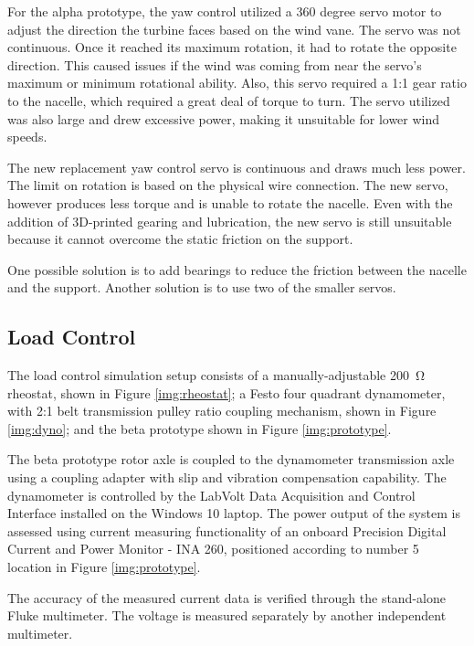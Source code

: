 \documentclass[11pt,letterpaper,conference]{IEEEtran}
\begin{document}
For the alpha prototype, the yaw control utilized a 360 degree servo motor to
adjust the direction the turbine faces based on the wind vane. The servo was
not continuous. Once it reached its maximum rotation, it had to rotate the
opposite direction. This caused issues if the wind was coming from near the
servo's maximum or minimum rotational ability. Also, this servo required a
1:1 gear ratio to the nacelle, which required a great deal of torque to turn.
The servo utilized was also large and drew excessive power, making it unsuitable
for lower wind speeds.

The new replacement yaw control servo is continuous and draws much less power.
The limit on rotation is based on the physical wire connection. The new servo,
however produces less torque and is unable to rotate the nacelle. Even with
the addition of 3D-printed gearing and lubrication, the new servo is still
unsuitable because it cannot overcome the static friction on the support.

One possible solution is to add bearings to reduce the friction between the
nacelle and the support. Another solution is to use two of the smaller servos.


\subsection{Load Control}
\label{sec:load_control}

The load control simulation setup consists of a manually-adjustable
\qty{200}{\ohm} rheostat, shown in Figure \ref{img:rheostat}; a Festo four
quadrant dynamometer, with 2:1 belt transmission pulley ratio coupling
mechanism, shown in Figure \ref{img:dyno}; and the beta prototype shown in
Figure \ref{img:prototype}.

The beta prototype rotor axle is coupled to the dynamometer transmission
axle using a coupling adapter with slip and vibration compensation
capability. The dynamometer is controlled by the LabVolt Data Acquisition
and Control Interface installed on the Windows 10 laptop. The power output
of the system is assessed using current measuring functionality of an
onboard Precision Digital Current and Power Monitor - INA 260, positioned
according to number 5 location in Figure \ref{img:prototype}.

The accuracy of the measured current data is verified through the stand-alone
Fluke multimeter. The voltage is measured separately by another independent
multimeter.
\end{document}
